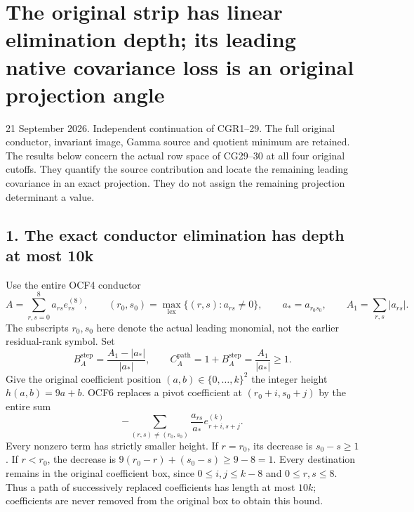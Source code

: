 \section{The original strip has linear elimination depth; its leading native covariance loss is an original projection angle}\label{the-original-strip-has-linear-elimination-depth-its-leading-native-covariance-loss-is-an-original-projection-angle}

21 September 2026. Independent continuation of CGR1--29. The full original conductor, invariant image, Gamma source and quotient minimum are retained. The results below concern the actual row space of CG29--30 at all four original cutoffs. They quantify the source contribution and locate the remaining leading covariance in an exact projection. They do not assign the remaining projection determinant a value.

\subsection{1. The exact conductor elimination has depth at most 10k}\label{the-exact-conductor-elimination-has-depth-at-most-10k}

Use the entire OCF4 conductor \[
A=\sum_{r,s=0}^{8}a_{rs}e_{rs}^{(8)},\qquad
(r_0,s_0)=\max_{\mathrm{lex}}\{(r,s):a_{rs}\ne0\},\qquad
a_*=a_{r_0s_0},\qquad A_1=\sum_{r,s}|a_{rs}|.
\tag{CGS1}
\] The subscripts \(r_0,s_0\) here denote the actual leading monomial, not the earlier residual-rank symbol. Set \[
B_A^{\mathrm{step}}=\frac{A_1-|a_*|}{|a_*|},\qquad
C_A^{\mathrm{path}}=1+B_A^{\mathrm{step}}=\frac{A_1}{|a_*|}\ge1.
\tag{CGS2}
\] Give the original coefficient position \((a,b)\in\{0,\ldots,k\}^2\) the integer height \(h(a,b)=9a+b\). OCF6 replaces a pivot coefficient at \((r_0+i,s_0+j)\) by the entire sum \[
-\sum_{(r,s)\ne(r_0,s_0)}\frac{a_{rs}}{a_*}
   e_{r+i,s+j}^{(k)}.
\tag{CGS3}
\] Every nonzero term has strictly smaller height. If \(r=r_0\), its decrease is \(s_0-s\ge1\). If \(r<r_0\), the decrease is \(9(r_0-r)+(s_0-s)\ge9-8=1\). Every destination remains in the original coefficient box, since \(0\le i,j\le k-8\) and \(0\le r,s\le8\). Thus a path of successively replaced coefficients has length at most \(10k\); coefficients are never removed from the original box to obtain this bound.

